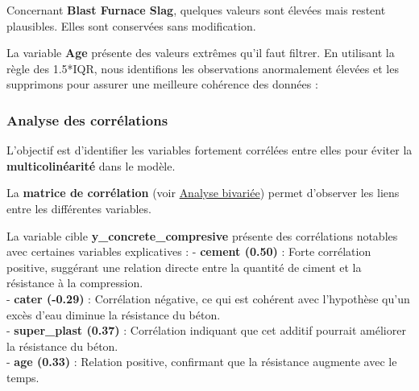 \documentclass[
  12pt,
]{article}
\newenvironment{Shaded}{\begin{snugshade}}{\end{snugshade}}
\newcommand{\CommentTok}[1]{\textcolor[rgb]{0.56,0.35,0.01}{\textit{#1}}}
\newcommand{\FloatTok}[1]{\textcolor[rgb]{0.00,0.00,0.81}{#1}}
\newcommand{\FunctionTok}[1]{\textcolor[rgb]{0.13,0.29,0.53}{\textbf{#1}}}
\newcommand{\NormalTok}[1]{#1}
\newcommand{\OtherTok}[1]{\textcolor[rgb]{0.56,0.35,0.01}{#1}}
\newcommand{\SpecialCharTok}[1]{\textcolor[rgb]{0.81,0.36,0.00}{\textbf{#1}}}
\begin{document}
Concernant \textbf{Blast Furnace Slag}, quelques valeurs sont élevées
mais restent plausibles. Elles sont conservées sans modification.

La variable \textbf{Age} présente des valeurs extrêmes qu'il faut
filtrer. En utilisant la règle des 1.5*IQR, nous identifions les
observations anormalement élevées et les supprimons pour assurer une
meilleure cohérence des données :

\begin{Shaded}
\end{Shaded}

\subsubsection{Analyse des
corrélations}\label{analyse-des-corruxe9lations}

L'objectif est d'identifier les variables fortement corrélées entre
elles pour éviter la \textbf{multicolinéarité} dans le modèle.

La \textbf{matrice de corrélation} (voir
\hyperref[matrice-de-correlation]{Analyse bivariée}) permet d'observer
les liens entre les différentes variables.

La variable cible \textbf{y\_concrete\_compresive} présente des
corrélations notables avec certaines variables explicatives : -
\textbf{cement (0.50)} : Forte corrélation positive, suggérant une
relation directe entre la quantité de ciment et la résistance à la
compression.\\
- \textbf{cater (-0.29)} : Corrélation négative, ce qui est cohérent
avec l'hypothèse qu'un excès d'eau diminue la résistance du béton.\\
- \textbf{super\_plast (0.37)} : Corrélation indiquant que cet additif
pourrait améliorer la résistance du béton.\\
- \textbf{age (0.33)} : Relation positive, confirmant que la résistance
augmente avec le temps.
\end{document}
